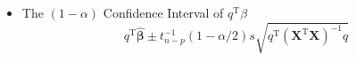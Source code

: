 \documentclass[11pt]{article}
\begin{document}
\begin{itemize}
\item The $(1-\alpha)$ Confidence Interval of $q^{\mathrm{T}}\beta$\\
\label{sec-1-2-3-3}%
$$q^{\mathrm{T}}\hat{\mathbf{\beta}} \pm
t^{-1}_{n-p}(1-\alpha/2)s\sqrt{q^{\mathrm{T}}(\mathbf{X}^{\mathrm{T}}\mathbf{X})^{-1}q}$$


\end{itemize} %
\end{document}
